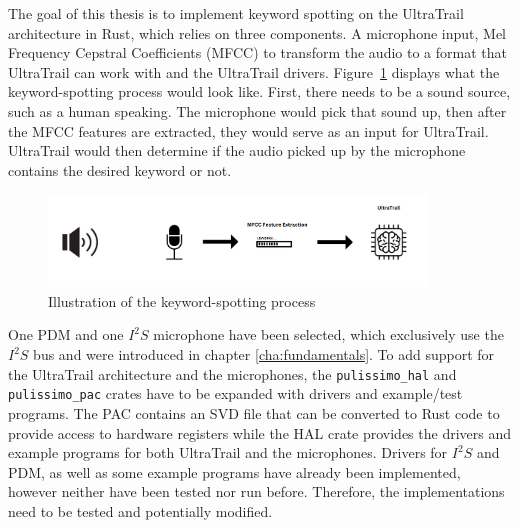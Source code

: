 
The goal of this thesis is to implement keyword spotting on the UltraTrail architecture in Rust,
which relies on three components.
A microphone input, Mel Frequency Cepstral Coefficients (MFCC) \cite[Cha 2.5]{rust_pulp} to transform the audio to
a format that UltraTrail can work with and the UltraTrail drivers.
Figure~\ref{fig:pipeline} displays what the keyword-spotting process would look like.
First, there needs to be a sound source, such as a human speaking.
The microphone would pick that sound up, then after the MFCC features are extracted, they would serve
as an input for UltraTrail. UltraTrail would then determine if the audio picked up by the microphone
contains the desired keyword or not.

\begin{figure}[H]
    \centering
    \includegraphics[width=0.9\textwidth]{figures/pipeline.png}
    \caption[Illustration of the keyword-spotting process]{Illustration of the keyword-spotting process}
    \label{fig:pipeline}
\end{figure}

One PDM and one $I^2S$ microphone have been selected, which exclusively use the $I^2S$ bus and were introduced
in chapter \ref{cha:fundamentals}.
To add support for the UltraTrail architecture and the microphones, the \lstinline{pulissimo_hal}
and \lstinline{pulissimo_pac} crates have to be expanded with drivers and example/test programs.
The PAC contains an SVD file that can be converted to Rust code to provide access to hardware registers
while the HAL crate provides the drivers and example programs for both UltraTrail and the microphones.
Drivers for $I^2S$ and PDM, as well as some example programs have already been implemented,
however neither have been tested nor run before.
Therefore, the implementations need to be tested and potentially modified.

